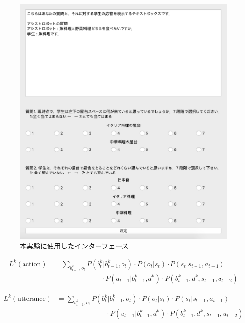 \begin{figure}[htbp]
  \begin{center}
    \includegraphics[scale=0.6]{./interface.pdf}
    \caption{本実験に使用したインターフェース}
    \label{fig:interface}
  \end{center}
\end{figure}

\begin{equation}
  \begin{split}
  \label{uiom_a}
  L^k({\mathrm{action}})&= \sum_{b_{t-1}^k,o_t}P(b_t^k|b_{t-1}^k,o_t)\cdot P(o_t|s_t)\cdot P(s_t|s_{t-1},a_{t-1})\\
  &\hspace{3cm}\cdot P(a_{t-1}|b_{t-1}^k,d^k)\cdot P(b_{t-1}^k,d^k,s_{t-1},a_{t-2})
  \end{split}
\end{equation}

\begin{equation}
  \begin{split}
  \label{uiom_u}
  L^k({\mathrm{utterance}})&= \sum_{b_{t-1}^k,o_t}P(b_t^k|b_{t-1}^k,o_t)\cdot P(o_t|s_t)\cdot P(s_t|s_{t-1},a_{t-1})\\
  &\hspace{3cm}\cdot P(u_{t-1}|b_{t-1}^k,d^k)\cdot P(b_{t-1}^k,d^k,s_{t-1},u_{t-2})
  \end{split}
\end{equation}




